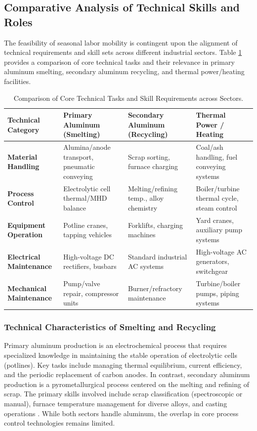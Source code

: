\documentclass[preprint,12pt]{elsarticle}
\begin{document}
\subsection{Comparative Analysis of Technical Skills and Roles}\label{labor_skills}

The feasibility of seasonal labor mobility is contingent upon the alignment of technical requirements and skill sets across different industrial sectors. Table \ref{tab:skill_comparison} provides a comparison of core technical tasks and their relevance in primary aluminum smelting, secondary aluminum recycling, and thermal power/heating facilities.

\begin{table}[h]
\centering
\caption{Comparison of Core Technical Tasks and Skill Requirements across Sectors.}
\begin{tabular}{@{}p{3.5cm}p{3cm}p{3cm}p{3cm}@{}}
\toprule
\textbf{Technical Category} & \textbf{Primary Aluminum (Smelting)} & \textbf{Secondary Aluminum (Recycling)} & \textbf{Thermal Power / Heating} \\ \midrule
\textbf{Material Handling} & Alumina/anode transport, pneumatic conveying & Scrap sorting, furnace charging & Coal/ash handling, fuel conveying systems \\
\textbf{Process Control} & Electrolytic cell thermal/MHD balance & Melting/refining temp., alloy chemistry & Boiler/turbine thermal cycle, steam control \\
\textbf{Equipment Operation} & Potline cranes, tapping vehicles & Forklifts, charging machines & Yard cranes, auxiliary pump systems \\
\textbf{Electrical Maintenance} & High-voltage DC rectifiers, busbars & Standard industrial AC systems & High-voltage AC generators, switchgear \\
\textbf{Mechanical Maintenance} & Pump/valve repair, compressor units & Burner/refractory maintenance & Turbine/boiler pumps, piping systems \\ \bottomrule
\end{tabular}
\label{tab:skill_comparison}
\end{table}

\subsubsection{Technical Characteristics of Smelting and Recycling}
Primary aluminum production is an electrochemical process that requires specialized knowledge in maintaining the stable operation of electrolytic cells (potlines). Key tasks include managing thermal equilibrium, current efficiency, and the periodic replacement of carbon anodes. In contrast, secondary aluminum production is a pyrometallurgical process centered on the melting and refining of scrap. The primary skills involved include scrap classification (spectroscopic or manual), furnace temperature management for diverse alloys, and casting operations \citep{primary_vs_secondary_2026, okon_scrap_melting_2026}. While both sectors handle aluminum, the overlap in core process control technologies remains limited.
\end{document}
